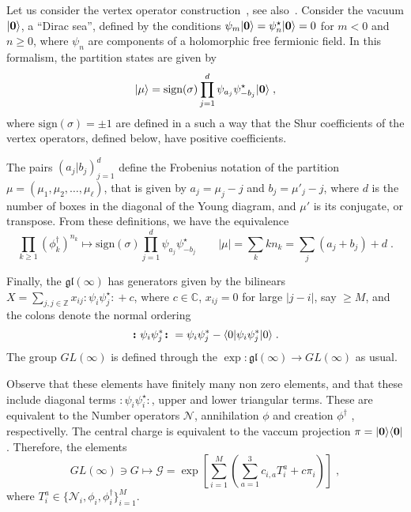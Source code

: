 \documentclass[a4paper,11pt]{amsart}
\begin{document}
Let us consider the vertex operator construction~\cite{Okounkov2001},
see also~\cite{Alexandrov:2012tr, Wheeler:2010vmq}. Consider the
vacuum \(\lvert\bm{0}\rangle\), a ``Dirac sea'', defined by the conditions \(\psi_m\lvert\bm{0}\rangle
= \psi_n^\star\lvert\bm{0}\rangle =0 \) for \(m<0\) and \(n \geq 0\), where 
\(\psi_n\) are components of a holomorphic free fermionic field. 
In this formalism, the partition states are given by 
\begin{equation}
  \lvert\mu\rangle = \textrm{sign}(\sigma) \prod_{j=1}^d \psi_{a_j} \psi^\star_{-b_j}\lvert\bm{0}\rangle\; ,
\end{equation}
where \(\textrm{sign}(\sigma) = \pm 1\) are defined in a such a way
that the Shur coefficients of the vertex operators, defined below,
have positive coefficients.

The pairs \((a_j|b_j)_{j=1}^d\) define the Frobenius notation of the
partition \(\mu = (\mu_1, \mu_2, \dots, \mu_\ell)\), that is given by
\(a_j = \mu_j - j\) and \(b_j = \mu'_j - j\), where \(d\) is the
number of boxes in the diagonal of the Young diagram, and \(\mu'\) is
its conjugate, or transpose.  From these definitions, we have the
equivalence
\begin{equation}
  \prod_{k\geq 1} (\phi_k^\dagger)^{n_k} \mapsto \textrm{sign}(\sigma) \prod_{j=1}^d
  \psi_{a_j} \psi^\star_{-b_j} \qquad |\mu| = \sum_k k n_k = \sum_j(a_j + b_j) + d\; .
\end{equation}

Finally, the \(\mathfrak{gl}(\infty)\) has generators given by the
bilinears \(X = \sum_{j, j \in \mathbb{Z}} x_{ij} \bm{\colon} \psi_i \psi_j^\star\bm{\colon}
+ c\), where \(c\in \mathbb{C}\), \(x_{ij} =
0\) for large \(|j -i|\), say \(\geq M\), and the colons denote the normal ordering
\begin{equation}
  \bm{\colon} \psi_i \psi_j^\ast \bm{\colon} =  \psi_i \psi_j^\ast
  - \langle0\rvert \psi_i \psi_j^\ast \lvert0\rangle \; .
\end{equation}
The group \(GL(\infty)\) is defined through the \(\exp:
\mathfrak{gl}(\infty) \to GL(\infty)\) as usual.

Observe that these elements have finitely many non zero elements, and
that these include diagonal terms \(\bm{\colon} \psi_i
\psi_i^\star\bm{\colon}\), upper and lower triangular terms. These are
equivalent to the Number operators \(\mathcal{N}\), annihilation
\(\phi\) and creation \(\phi^\dagger\) , respectivelly.  The central
charge is equivalent to the vaccum projection \(\pi =
\lvert\bm{0}\rangle\langle\bm{0}\rvert\). Therefore, the elements
\begin{equation}
   GL(\infty) \ni G \mapsto
   \mathcal{G} = \exp \left[\sum_{i=1}^M \left( \sum_{a=1}^3
   c_{i, a} T_i^{a}  + c \pi_i \right)\right]\; ,
\end{equation}
where \(T^{a}_i \in \{ \mathcal{N}_i, \phi_i, \phi_i^\dagger \}_{i=1}^M\). 
\end{document}
